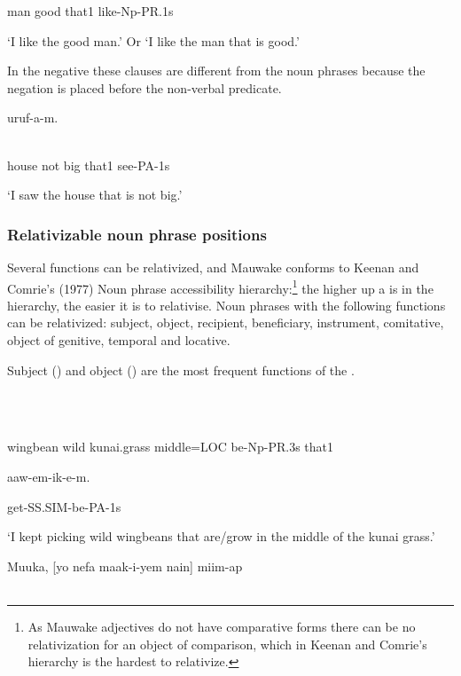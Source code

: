 man  good  that1  like-Np-PR.1s

`I like the good man.' Or `I like the man that is good.'

In the negative these clauses are different from the noun phrases because the negation is placed before the non-verbal predicate.

\ea%
\label{ex:x1551}
  uruf-a-m. \\
      \\
\glt
\z

house  not  big  that1  see-PA-1s

`I saw the house that is not big.'

\subsubsection[Relativizable noun phrase positions]{Relativizable noun phrase positions}
\hypertarget{RefHeading23361935131865}{}
Several  functions can be relativized, and Mauwake conforms to Keenan and Comrie's (1977) Noun phrase accessibility hierarchy:\footnote{As Mauwake adjectives do not have comparative forms there can be no relativization for an object of comparison, which in Keenan and Comrie's hierarchy is the hardest to relativize.}  the higher up a  is in the hierarchy, the easier it is to relativise. Noun phrases with the following functions can be relativized: subject, object, recipient, beneficiary, instrument, comitative, object of genitive, temporal and locative. 

Subject () and object () are the most frequent functions of the .

\ea%
\label{ex:x1537}
\gll [\textstyleEmphasizedVernacularWords{Mesa  asia}  fiker(a)  gone=pa  ika-i-ya  nain]  \\
      \\
\glt
\z

wingbean  wild  kunai.grass  middle=LOC  be-Np-PR.3s  that1

aaw-em-ik-e-m.

get-SS.SIM-be-PA-1s

`I kept picking wild wingbeans that are/grow in the middle of the kunai grass.'

\ea%
\label{ex:x1538}
\gll Muuka,  [yo    nefa  maak-i-yem  nain]  miim-ap \\
      \\
\glt
\z

